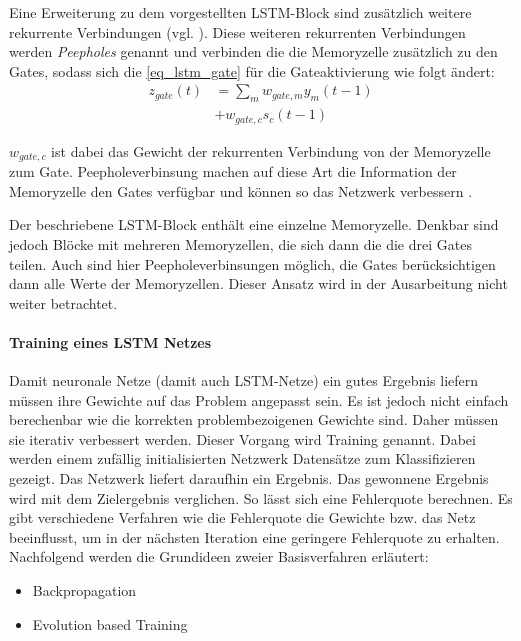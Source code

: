 Eine Erweiterung zu dem vorgestellten \ac{LSTM}-Block sind zusätzlich weitere
rekurrente Verbindungen (vgl. \cite{Gers2002b}). Diese weiteren rekurrenten
Verbindungen werden \textit{Peepholes} genannt und verbinden die die Memoryzelle
zusätzlich zu den Gates, sodass sich die \autoref{eq_lstm_gate} für die Gateaktivierung
wie folgt ändert:
\begin{equation}
\label{eq_lstm_gate_peephole}
\begin{split}
z_{gate}(t) &= \sum \limits_{m} w_{gate,m}y_m(t-1) \\
			&+ w_{gate,c} s_c(t-1)
\end{split}
\end{equation}

$w_{gate,c}$ ist dabei das Gewicht der rekurrenten Verbindung von der
Memoryzelle zum Gate. Peepholeverbinsung machen auf diese Art die Information
der Memoryzelle den Gates verfügbar und können so das Netzwerk verbessern
\cite{Gers2002b}. 

Der beschriebene \ac{LSTM}-Block enthält eine einzelne Memoryzelle. Denkbar sind
jedoch Blöcke mit mehreren Memoryzellen, die sich dann die die drei Gates
teilen. Auch sind hier Peepholeverbinsungen möglich, die Gates berücksichtigen
dann alle Werte der Memoryzellen. Dieser Ansatz wird in der Ausarbeitung nicht
weiter betrachtet. 

\paragraph{Training eines \ac{LSTM} Netzes}
Damit neuronale Netze (damit auch \ac{LSTM}-Netze) ein gutes
Ergebnis liefern müssen ihre Gewichte auf das Problem angepasst sein. Es ist
jedoch nicht einfach berechenbar wie die korrekten problembezoigenen Gewichte
sind. Daher müssen sie iterativ verbessert werden. Dieser Vorgang wird Training
genannt. Dabei werden einem zufällig initialisierten Netzwerk Datensätze zum
Klassifizieren gezeigt. Das Netzwerk liefert daraufhin ein Ergebnis. Das
gewonnene Ergebnis wird mit dem Zielergebnis verglichen. So lässt sich eine
Fehlerquote berechnen. Es gibt verschiedene Verfahren wie die Fehlerquote die
Gewichte bzw. das Netz beeinflusst, um in der nächsten Iteration eine geringere
Fehlerquote zu erhalten. Nachfolgend werden die Grundideen zweier Basisverfahren
erläutert:
\begin{itemize}
	\item Backpropagation
	\item Evolution based Training
\end{itemize}

